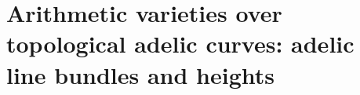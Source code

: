 \documentclass [11pt,reqno]{amsart}
\newcommand{\1}{\mathmybb{1}}
\begin{document}

\part{Arithmetic varieties over topological adelic curves: adelic line bundles and heights}
\end{document}
